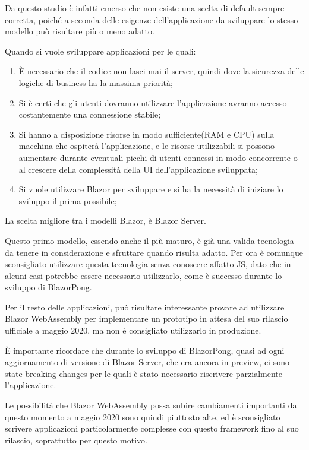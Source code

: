 Da questo studio \`e infatti emerso che non esiste una scelta di default sempre corretta, poich\'e a seconda delle esigenze dell'applicazione da sviluppare lo stesso modello pu\`o risultare pi\`u o meno adatto.

Quando si vuole sviluppare applicazioni per le quali:
\begin{enumerate}
	\item \`E necessario che il codice non lasci mai il server, quindi dove la sicurezza delle logiche di business ha la massima priorit\`a;
	\item Si \`e certi che gli utenti dovranno utilizzare l'applicazione avranno accesso costantemente una connessione stabile;
	\item Si hanno a disposizione risorse in modo sufficiente(RAM e CPU) sulla macchina che ospiter\`a l'applicazione, e le risorse utilizzabili si possono aumentare durante eventuali picchi di utenti connessi in modo concorrente o al crescere della complessit\`a della UI dell'applicazione sviluppata;
	\item Si vuole utilizzare Blazor per sviluppare e si ha la necessit\`a di iniziare lo sviluppo il prima possibile;
\end{enumerate}

La scelta migliore tra i modelli Blazor, \`e Blazor Server.

Questo primo modello, essendo anche il pi\`u maturo, \`e gi\`a una valida tecnologia da tenere in considerazione e sfruttare quando risulta adatto.
Per ora \`e comunque sconsigliato utilizzare questa tecnologia senza conoscere affatto JS, dato che in alcuni casi potrebbe essere necessario utilizzarlo, come \`e successo durante lo sviluppo di BlazorPong.

Per il resto delle applicazioni, pu\`o risultare interessante provare ad utilizzare Blazor WebAssembly per implementare un prototipo in attesa del suo rilascio ufficiale a maggio 2020, ma non \`e consigliato utilizzarlo in produzione.

\`E importante ricordare che durante lo sviluppo di BlazorPong, quasi ad ogni aggiornamento di versione di Blazor Server, che era ancora in preview, ci sono state breaking changes per le quali \`e stato necessario riscrivere parzialmente l'applicazione.

Le possibilit\`a che Blazor WebAssembly possa subire cambiamenti importanti da questo momento a maggio 2020 sono quindi piuttosto alte, ed \`e sconsigliato scrivere applicazioni particolarmente complesse con questo framework fino al suo rilascio, soprattutto per questo motivo.

